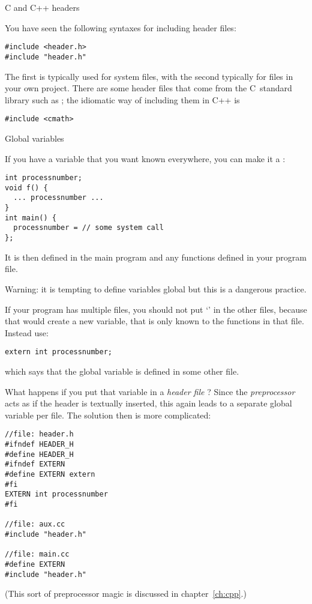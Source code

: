  {C and C++ headers}

You have seen the following syntaxes for including header files:
\begin{verbatim}
#include <header.h>
#include "header.h"
\end{verbatim}
The first is typically used for system files, with the second
typically for files in your own project. There are some header files
that come from the C~standard library such as ; the
idiomatic way of including them in C++ is
\begin{verbatim}
#include <cmath>
\end{verbatim}

 {Global variables}
\label{ex:globalvar}

If you have a variable that you want known everywhere, you can make it
a :
\begin{verbatim}
int processnumber;
void f() {
  ... processnumber ...
}
int main() {
  processnumber = // some system call
};
\end{verbatim}
It is then defined in the main program and any functions defined in your program file.

Warning: it is tempting to define variables global but this is a
dangerous practice.

If your program has multiple files, you should not put `'
in the other files, because that would create a new variable, that is
only known to the functions in that file. Instead use:
\begin{verbatim}
extern int processnumber;
\end{verbatim}
which says that the global variable  is defined in
some other file.

What happens if you put that variable in a
%
\emph{header file}%
%
? Since the
%
\emph{preprocessor}%
acts as if the header is textually inserted, this again leads to
a separate global variable per file. The solution then is more
complicated:
\begin{verbatim}
//file: header.h
#ifndef HEADER_H
#define HEADER_H
#ifndef EXTERN
#define EXTERN extern
#fi
EXTERN int processnumber
#fi

//file: aux.cc
#include "header.h"

//file: main.cc
#define EXTERN
#include "header.h"
\end{verbatim}
(This sort of preprocessor magic is discussed in chapter~\ref{ch:cpp}.)

